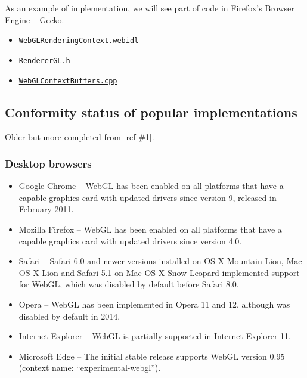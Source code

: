As an example of implementation, we will see part of code in Firefox's
Browser Engine -- Gecko.

\begin{itemize}
\tightlist
\item
  \href{https://github.com/mozilla/gecko-dev/blob/5a7da7930ebba958d98e2e42ed07d05c34d1873a/dom/webidl/WebGLRenderingContext.webidl}{\texttt{WebGLRenderingContext.webidl}}
\item
  \href{https://github.com/mozilla/gecko-dev/blob/71900c9741a8fafb137d9a57519dfa0fe280c4dc/gfx/angle/src/libANGLE/renderer/gl/RendererGL.h}{\texttt{RendererGL.h}}
\item
  \href{https://github.com/mozilla/gecko-dev/blob/7a82450687cc47dad34e3c89ca94cbd60bfd1aa6/dom/canvas/WebGLContextBuffers.cpp}{\texttt{WebGLContextBuffers.cpp}}
\end{itemize}

\subsection{Conformity status of popular
implementations}\label{conformity-status-of-popular-implementations}

Older but more completed from {[}ref \#1{]}.

\subsubsection{Desktop browsers}\label{desktop-browsers}

\begin{itemize}
\tightlist
\item
  Google Chrome -- WebGL has been enabled on all platforms that have a
  capable graphics card with updated drivers since version 9, released
  in February 2011.
\item
  Mozilla Firefox -- WebGL has been enabled on all platforms that have a
  capable graphics card with updated drivers since version 4.0.
\item
  Safari -- Safari 6.0 and newer versions installed on OS X Mountain
  Lion, Mac OS X Lion and Safari 5.1 on Mac OS X Snow Leopard
  implemented support for WebGL, which was disabled by default before
  Safari 8.0.
\item
  Opera -- WebGL has been implemented in Opera 11 and 12, although was
  disabled by default in 2014.
\item
  Internet Explorer -- WebGL is partially supported in Internet Explorer
  11.
\item
  Microsoft Edge -- The initial stable release supports WebGL version
  0.95 (context name: ``experimental-webgl'').
\end{itemize}

